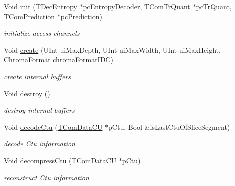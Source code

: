 \begin{DoxyCompactItemize}
\item 
\mbox{\label{class_t_dec_cu_a281f6dbb880300578ae9893ecfda6414}} 
Void \hyperlink{class_t_dec_cu_a281f6dbb880300578ae9893ecfda6414}{init} (\hyperlink{class_t_dec_entropy}{T\+Dec\+Entropy} $\ast$pc\+Entropy\+Decoder, \hyperlink{class_t_com_tr_quant}{T\+Com\+Tr\+Quant} $\ast$pc\+Tr\+Quant, \hyperlink{class_t_com_prediction}{T\+Com\+Prediction} $\ast$pc\+Prediction)
\begin{DoxyCompactList}\small\item\em initialize access channels \end{DoxyCompactList}\item 
Void \hyperlink{class_t_dec_cu_a1223633054f980c5ad9db3f080bbc5e7}{create} (U\+Int ui\+Max\+Depth, U\+Int ui\+Max\+Width, U\+Int ui\+Max\+Height, \hyperlink{_type_def_8h_a4a6c51c10f2eb04abc7209db7caff39f}{Chroma\+Format} chroma\+Format\+I\+DC)
\begin{DoxyCompactList}\small\item\em create internal buffers \end{DoxyCompactList}\item 
\mbox{\label{class_t_dec_cu_a074df825dece343ec4655ce4961e012b}} 
Void \hyperlink{class_t_dec_cu_a074df825dece343ec4655ce4961e012b}{destroy} ()
\begin{DoxyCompactList}\small\item\em destroy internal buffers \end{DoxyCompactList}\item 
Void \hyperlink{class_t_dec_cu_ae96ea338b90781036b4b36f0d50a7881}{decode\+Ctu} (\hyperlink{class_t_com_data_c_u}{T\+Com\+Data\+CU} $\ast$p\+Ctu, Bool \&is\+Last\+Ctu\+Of\+Slice\+Segment)
\begin{DoxyCompactList}\small\item\em decode Ctu information \end{DoxyCompactList}\item 
Void \hyperlink{class_t_dec_cu_a752e843a7f239ae07309bb9e057b3705}{decompress\+Ctu} (\hyperlink{class_t_com_data_c_u}{T\+Com\+Data\+CU} $\ast$p\+Ctu)
\begin{DoxyCompactList}\small\item\em reconstruct Ctu information \end{DoxyCompactList}\item 
\mbox{\label{class_t_dec_cu_a1b6468a75f24c8ffd5d8028f757afe7d}} 

\end{DoxyCompactItemize}
